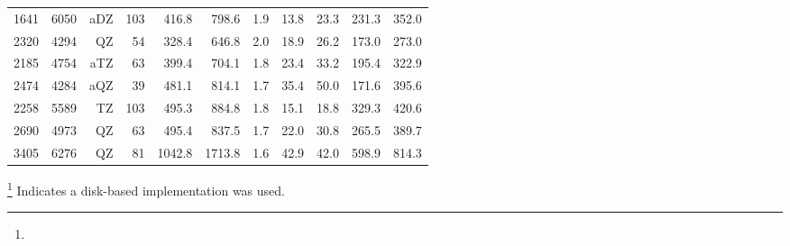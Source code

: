 \begin{table}[H]
\begin{tabular}{lrrrrrrrrrr}
1641 &6050&   aDZ&103&               416.8&               798.6 & 1.9 &               13.8 &               23.3 &              231.3 &              352.0\\
2320 &4294&    QZ& 54&               328.4&               646.8 & 2.0 &               18.9 &               26.2 &              173.0 &              273.0\\
2185 &4754&   aTZ& 63&               399.4&               704.1 & 1.8 &               23.4 &               33.2 &              195.4 &              322.9\\
2474 &4284&   aQZ& 39&               481.1&               814.1 & 1.7 &               35.4 &               50.0 &              171.6 &              395.6\\
2258 &5589&    TZ&103&               495.3&               884.8 & 1.8 &               15.1 &               18.8 &              329.3 &              420.6\\
2690 &4973&    QZ& 63&               495.4&               837.5 & 1.7 &               22.0 &               30.8 &              265.5 &              389.7\\
3405 &6276&    QZ& 81&              1042.8&              1713.8 & 1.6 &               42.9 &               42.0 &              598.9 &              814.3\\

\hline
\end{tabular}
\renewcommand{\thefootnote}{\fnsymbol{footnote}}
\footnote[2]{} Indicates a disk-based implementation was used.
\end{table}
\endgroup

